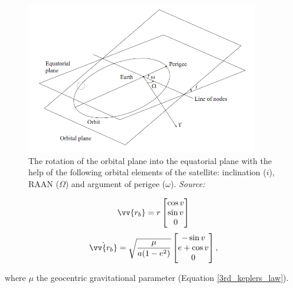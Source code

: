 \begin{figure}
\centering
\includegraphics[width=0.9\textwidth]{Images/orbit_to_space.png}\caption{The rotation of the orbital plane into the equatorial plane with the help of the following orbital elements of the satellite: inclination ($i$), RAAN ($\Omega$) and argument of perigee ($\omega$). \textit{Source: \cite{Montenbruck}}}
\label{orbit_to_space} 
\end{figure}

\begin{equation}
\label{position_orbital}
\vv{r_{b}} = r \begin{bmatrix} \cos{v} \\ \sin{v} \\ 0 \end{bmatrix}
\end{equation}
\begin{equation}
\label{velocity_orbital}
\dot{\vv{r_{b}}} = \sqrt{\frac{\mu}{a (1 - e^2)}} \begin{bmatrix} -\sin{v} \\ e + \cos{v} \\ 0 \end{bmatrix},
\end{equation}

where $\mu$ the geocentric gravitational parameter (Equation \ref{3rd_keplers_law}).


